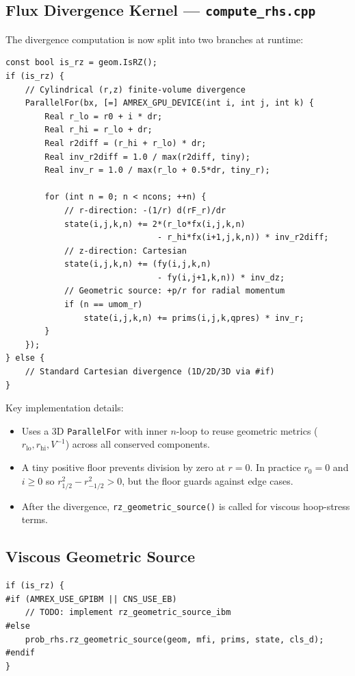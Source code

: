\documentclass[11pt,a4paper]{article}
\begin{document}
\subsection{Flux Divergence Kernel --- \texttt{compute\_rhs.cpp}}

The divergence computation is now split into two branches at runtime:

\begin{lstlisting}[caption={Simplified RZ branch structure}]
const bool is_rz = geom.IsRZ();
if (is_rz) {
    // Cylindrical (r,z) finite-volume divergence
    ParallelFor(bx, [=] AMREX_GPU_DEVICE(int i, int j, int k) {
        Real r_lo = r0 + i * dr;
        Real r_hi = r_lo + dr;
        Real r2diff = (r_hi + r_lo) * dr;
        Real inv_r2diff = 1.0 / max(r2diff, tiny);
        Real inv_r = 1.0 / max(r_lo + 0.5*dr, tiny_r);

        for (int n = 0; n < ncons; ++n) {
            // r-direction: -(1/r) d(rF_r)/dr
            state(i,j,k,n) += 2*(r_lo*fx(i,j,k,n)
                               - r_hi*fx(i+1,j,k,n)) * inv_r2diff;
            // z-direction: Cartesian
            state(i,j,k,n) += (fy(i,j,k,n)
                               - fy(i,j+1,k,n)) * inv_dz;
            // Geometric source: +p/r for radial momentum
            if (n == umom_r)
                state(i,j,k,n) += prims(i,j,k,qpres) * inv_r;
        }
    });
} else {
    // Standard Cartesian divergence (1D/2D/3D via #if)
}
\end{lstlisting}

Key implementation details:
\begin{itemize}
  \item Uses a 3D \texttt{ParallelFor} with inner $n$-loop to reuse
        geometric metrics ($r_{\text{lo}}, r_{\text{hi}}, V^{-1}$)
        across all conserved components.
  \item A tiny positive floor prevents division by zero at $r=0$.
        In practice $r_0 = 0$ and $i \geq 0$ so $r_{1/2}^2 - r_{-1/2}^2 > 0$,
        but the floor guards against edge cases.
  \item After the divergence, \texttt{rz\_geometric\_source()} is called
        for viscous hoop-stress terms.
\end{itemize}

\subsection{Viscous Geometric Source}

\begin{lstlisting}[caption={RZ viscous source dispatch}]
if (is_rz) {
#if (AMREX_USE_GPIBM || CNS_USE_EB)
    // TODO: implement rz_geometric_source_ibm
#else
    prob_rhs.rz_geometric_source(geom, mfi, prims, state, cls_d);
#endif
}
\end{lstlisting}
\end{document}
